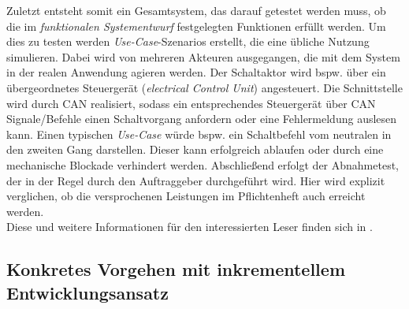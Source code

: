 Zuletzt entsteht somit ein Gesamtsystem, das darauf getestet werden muss, ob die im \textit{funktionalen Systementwurf} festgelegten Funktionen erfüllt werden. Um dies zu testen werden \textit{Use-Case}-Szenarios erstellt, die eine übliche Nutzung simulieren. Dabei wird von mehreren Akteuren ausgegangen, die mit dem System in der realen Anwendung agieren werden. Der Schaltaktor wird bspw. über ein übergeordnetes Steuergerät (\textit{electrical Control Unit}) angesteuert. Die Schnittstelle wird durch CAN realisiert, sodass ein entsprechendes Steuergerät über CAN Signale/Befehle einen Schaltvorgang anfordern oder eine Fehlermeldung auslesen kann. Einen typischen \textit{Use-Case} würde bspw. ein Schaltbefehl vom neutralen in den zweiten Gang darstellen. Dieser kann erfolgreich ablaufen oder durch eine mechanische Blockade verhindert werden. Abschließend erfolgt der Abnahmetest, der in der Regel durch den Auftraggeber durchgeführt wird. Hier wird explizit verglichen, ob die versprochenen Leistungen im Pflichtenheft auch erreicht werden.\\
Diese und weitere Informationen für den interessierten Leser finden sich in \cite{BasSof}.

\subsection{Konkretes Vorgehen mit inkrementellem Entwicklungsansatz}

